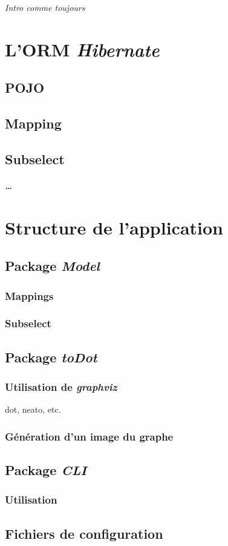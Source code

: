 \textit{Intro comme toujours}

\section{L'ORM \emph{Hibernate}}
\subsection{POJO}
\subsection{Mapping}
\subsection{Subselect}
\subparagraph{\ldots}

\section{Structure de l'application}
\subsection{Package \emph{Model}}
\subsubsection{Mappings}
\subsubsection{Subselect}
\subsection{Package \emph{toDot}}
\subsubsection{Utilisation de \emph{graphviz}}
dot, neato, etc.
\subsubsection{Génération d'un image du graphe}
\subsection{Package \emph{CLI}}
\subsubsection{Utilisation}
\subsection{Fichiers de configuration}
